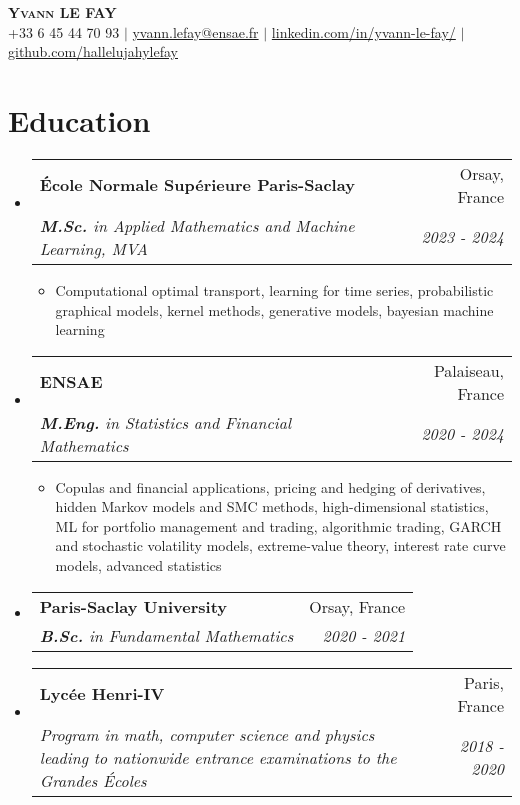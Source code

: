 \documentclass[letterpaper,10pt]{article}
\makeatletter
\newcommand{\resumeItem}[1]{
    \item\small{
            {#1 \vspace{-2pt}}
    }
}
\newcommand{\resumeSubheading}[4]{
    \vspace{-2pt}\item
    \begin{tabular*}{0.97\textwidth}[t]{l@{\extracolsep{\fill}}r}
        \textbf{#1}       & #2                 \\
        \textit{\small#3} & \textit{\small #4} \\
    \end{tabular*}\vspace{-7pt}
}
\newcommand{\resumeSubHeadingListStart}{\begin{itemize}[leftmargin=0.15in, label={}]}
\newcommand{\resumeSubHeadingListEnd}{\end{itemize}}
\newcommand{\resumeItemListStart}{\begin{itemize}}
\newcommand{\resumeItemListEnd}{\end{itemize}\vspace{-5pt}}
\makeatother
\begin{document}

\begin{center}
\textbf{\scshape Yvann LE FAY} \\ \vspace{1pt}
\small +33 6 45 44 70 93 $|$ \href{mailto:yvann.lefay@ensae.fr}{yvann.lefay@ensae.fr} $|$
\href{https://linkedin.com/in/yvann-le-fay/}{linkedin.com/in/yvann-le-fay/} $|$
\href{https://github.com/hallelujahylefay}{github.com/hallelujahylefay}
\end{center}


\section{Education}
\resumeSubHeadingListStart
\resumeSubheading
{\'Ecole Normale Supérieure Paris-Saclay}{Orsay, France}{\textbf{M.Sc.} in Applied Mathematics and Machine Learning, MVA}{2023 - 2024}
\resumeItemListStart
\resumeItem{Computational optimal transport, learning for time series, probabilistic graphical models, kernel methods, generative models, bayesian machine learning}
\resumeItemListEnd
\resumeSubheading
{ENSAE}{Palaiseau, France}{\textbf{M.Eng.} in Statistics and Financial Mathematics}{2020 - 2024}
\resumeItemListStart
\resumeItem{Copulas and financial applications, pricing and hedging of derivatives, hidden Markov models and SMC methods, high-dimensional statistics, ML for portfolio management and trading, algorithmic trading, GARCH and stochastic volatility models, extreme-value theory, interest rate curve models, advanced statistics}
\resumeItemListEnd
\resumeSubheading
{Paris-Saclay University}{Orsay, France}{\textbf{B.Sc.} in Fundamental Mathematics }
{2020 - 2021}
\resumeSubheading{Lycée Henri-IV}{Paris, France}
{Program in math, computer science and physics leading to nationwide entrance examinations to the \textit{Grandes Écoles}}{2018 - 2020}
\resumeSubHeadingListEnd
\end{document}
